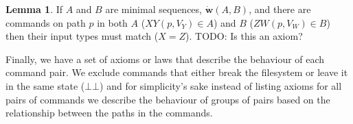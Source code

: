 \documentclass[12pt]{article}
\newcommand{\empt}{\bot}
\newcommand{\fscommand}[2]{{#1#2}}
\newcommand{\fsregcommandchar}[1]{\mathtt{#1}}
\newcommand{\fsregcommand}[2]{\fscommand{\fsregcommandchar{#1}}{\fsregcommandchar{#2}}}
\newcommand{\cbb}{\fsregcommand{\empt}{\empt}}
\newcommand{\cxy}{\fscommand{X}{Y}}
\newcommand{\czw}{\fscommand{Z}{W}}
\newcommand{\works}[1]{\dot{\mathbf{w}}({#1})}
\theoremstyle{definition}
\newtheorem{mylem}{Lemma}
\begin{document}
\begin{mylem}\label{worksinputmatch}
If $A$ and $B$ are minimal sequences, $\works{A,B}$,
and there are commands on path $p$ in both $A$ ($\cxy(p, V_Y)\in A$) and $B$ ($\czw(p, V_W)\in B$)
then their input types must match ($X=Z$).
TODO: Is this an axiom?
\end{mylem}






Finally, we have a set of axioms or laws that describe the behaviour
of each command pair. We exclude commands that either break the
filesystem or leave it in the same state ($\cbb$) and for
simplicity's sake instead of listing axioms for all pairs of commands
we describe the behaviour of groups of pairs
based on the relationship between the paths in the commands.
\end{document}
